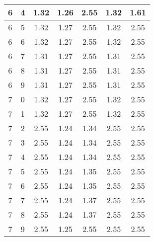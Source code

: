 \begin{longtable}{|c|c||c||c|c||c|c|}
	6 & 4 & 1.32 & 1.26 & 2.55 & 1.32 & 1.61 \\ \hline
	6 & 5 & 1.32 & 1.27 & 2.55 & 1.32 & 2.55 \\ \hline
	6 & 6 & 1.32 & 1.27 & 2.55 & 1.32 & 2.55 \\ \hline
	6 & 7 & 1.31 & 1.27 & 2.55 & 1.31 & 2.55 \\ \hline
	6 & 8 & 1.31 & 1.27 & 2.55 & 1.31 & 2.55 \\ \hline
	6 & 9 & 1.31 & 1.27 & 2.55 & 1.31 & 2.55 \\ \hline
	7 & 0 & 1.32 & 1.27 & 2.55 & 1.32 & 2.55 \\ \hline
	7 & 1 & 1.32 & 1.27 & 2.55 & 1.32 & 2.55 \\ \hline
	7 & 2 & 2.55 & 1.24 & 1.34 & 2.55 & 2.55 \\ \hline
	7 & 3 & 2.55 & 1.24 & 1.34 & 2.55 & 2.55 \\ \hline
	7 & 4 & 2.55 & 1.24 & 1.34 & 2.55 & 2.55 \\ \hline
	7 & 5 & 2.55 & 1.24 & 1.35 & 2.55 & 2.55 \\ \hline
	7 & 6 & 2.55 & 1.24 & 1.35 & 2.55 & 2.55 \\ \hline
	7 & 7 & 2.55 & 1.24 & 1.37 & 2.55 & 2.55 \\ \hline
	7 & 8 & 2.55 & 1.24 & 1.37 & 2.55 & 2.55 \\ \hline
	7 & 9 & 2.55 & 1.25 & 2.55 & 2.55 & 2.55 \\ \hline
\end{longtable}

